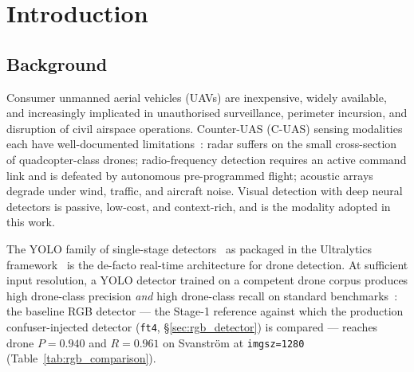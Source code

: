 \chapter{Introduction}
\label{ch:introduction}

\section{Background}

Consumer unmanned aerial vehicles (UAVs) are inexpensive, widely available, and increasingly implicated in unauthorised surveillance, perimeter incursion, and disruption of civil airspace operations. Counter-UAS (C-UAS) sensing modalities each have well-documented limitations~\cite{shi2018counteruas}: radar suffers on the small cross-section of quadcopter-class drones; radio-frequency detection requires an active command link and is defeated by autonomous pre-programmed flight; acoustic arrays degrade under wind, traffic, and aircraft noise. Visual detection with deep neural detectors is passive, low-cost, and context-rich, and is the modality adopted in this work.

The YOLO family of single-stage detectors~\cite{redmon2016yolo} as packaged in the Ultralytics framework~\cite{ultralytics2024} is the de-facto real-time architecture for drone detection. At sufficient input resolution, a YOLO detector trained on a competent drone corpus produces high drone-class precision \emph{and} high drone-class recall on standard benchmarks~\cite{svanstrom2021real,jiang2021antiuav}: the baseline RGB detector --- the Stage-1 reference against which the production confuser-injected detector (\texttt{ft4}, \S\ref{sec:rgb_detector}) is compared --- reaches drone $P=0.940$ and $R=0.961$ on Svanstr\"om at \texttt{imgsz=1280} (Table~\ref{tab:rgb_comparison}).

